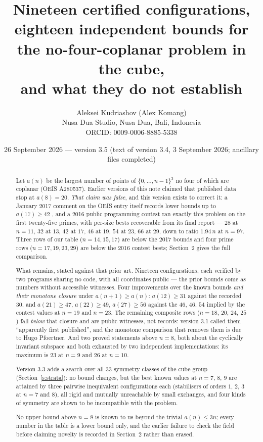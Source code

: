 \documentclass[11pt,a4paper]{article}
\title{Nineteen certified configurations, eighteen independent bounds for the no-four-coplanar problem in the cube,\\
and what they do not establish}
\author{Aleksei Kudriashov (Alex Komang)\\ \small Nusa Dua Studio, Nusa Dua, Bali, Indonesia\\ \small ORCID: 0009-0006-8885-5338}
\date{26 September 2026 --- version 3.5 (text of version 3.4, 3 September 2026; ancillary files completed)}
\begin{document}
\maketitle
\begin{abstract}
Let $a(n)$ be the largest number of points of $\{0,\dots,n-1\}^3$ no four of which are coplanar
(OEIS A280537).  Earlier versions of this note claimed that published data stop at $a(8)=20$.
\emph{That claim was false}, and this version exists to correct it: a January 2017 comment on
the OEIS entry itself records lower bounds up to $a(17)\ge42$ \cite{OEISA280537}, and a 2016
public programming contest ran exactly this problem on the first twenty-five primes, with
per-size bests recoverable from its final report \cite{AZsPCs} --- $28$ at $n=11$, $32$ at $13$,
$42$ at $17$, $46$ at $19$, $54$ at $23$, $66$ at $29$, down to ratio $1.94\,n$ at $n=97$.
Three rows of our table ($n=14,15,17$) are below the 2017 bounds and four prime rows
($n=17,19,23,29$) are below the 2016 contest bests; Section~2 gives the full comparison.

What remains, stated against that prior art.  Nineteen configurations, each verified by two
programs sharing no code, with all coordinates public --- the prior bounds come as numbers
without accessible witnesses.  Four improvements over the known bounds \emph{and their monotone
closure} under $a(n+1)\ge a(n)$: $a(12)\ge31$ against the recorded $30$, and $a(21)\ge47$,
$a(22)\ge49$, $a(27)\ge56$ against the $46$, $46$, $54$ implied by the contest values at $n=19$
and $n=23$.  The remaining composite rows ($n=18$, $20$, $24$, $25$) fall \emph{below} that
closure and are public witnesses, not records: version 3.1 called them ``apparently first
published'', and the monotone comparison that removes them is due to Hugo Pfoertner.  And two proved
statements above $n=8$, both about the cyclically invariant subspace and both exhausted by two
independent implementations: its maximum is $23$ at $n=9$ and $26$ at $n=10$.

Version 3.3 adds a search over all 33 symmetry classes of the cube group
(Section~\ref{s:strata}): no bound changes, but the best known values at $n=7$, $8$, $9$ are
attained by three pairwise inequivalent configurations each (stabilisers of orders $1$, $2$, $3$
at $n=7$ and $8$), all rigid and mutually unreachable by small exchanges, and four kinds of
symmetry are shown to be incompatible with the problem.

No upper bound above $n=8$ is known to us beyond the trivial $a(n)\le3n$; every number in the
table is a lower bound only, and the earlier failure to check the field before claiming novelty
is recorded in Section~2 rather than erased.
\end{abstract}
\end{document}
